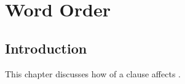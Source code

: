 \chapter{Word Order}\label{WordOrder}






%





\section{Introduction}\label{WO:Intro}

This chapter discusses how  of a clause affects
.

